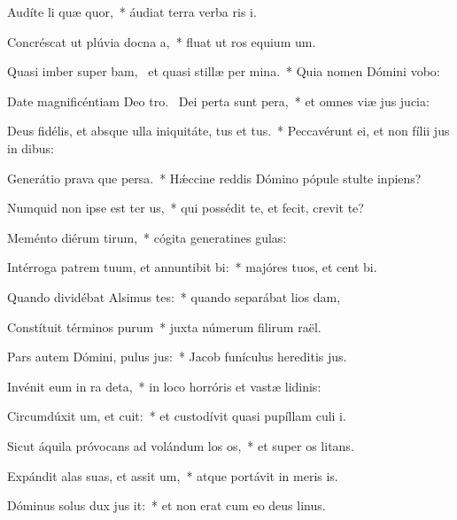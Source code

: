 \item Audíte li quæ quor,~* áudiat terra verba ris i.
\item Concréscat ut plúvia docna a,~* fluat ut ros equium um.
\item Quasi imber super bam,~\pscross{} et quasi stillæ per mina.~* Quia nomen Dómini vobo:
\item Date magnificéntiam Deo tro.~\pscross{} Dei perta sunt pera,~* et omnes viæ jus jucia:
\item Deus fidélis, et absque ulla iniquitáte, tus et tus.~* Peccavérunt ei, et non fílii jus in dibus:
\item Generátio prava que persa.~* Hǽccine reddis Dómino pópule stulte  inpiens?
\item Numquid non ipse est ter us,~* qui possédit te, et fecit,  crevit te?
\item Meménto diérum tirum,~* cógita generatines gulas:
\item Intérroga patrem tuum, et annuntibit bi:~* majóres tuos, et cent bi.
\item Quando dividébat Alsimus tes:~* quando separábat lios dam,
\item Constítuit términos purum~* juxta númerum filirum raël.
\item Pars autem Dómini, pulus jus:~* Jacob funículus hereditis jus.
\item Invénit eum in ra deta,~* in loco horróris et vastæ lidinis:
\item Circumdúxit um, et cuit:~* et custodívit quasi pupíllam culi i.
\item Sicut áquila próvocans ad volándum los os,~* et super os litans.
\item Expándit alas suas, et assit um,~* atque portávit in meris is.
\item Dóminus solus dux jus it:~* et non erat cum eo deus linus.
